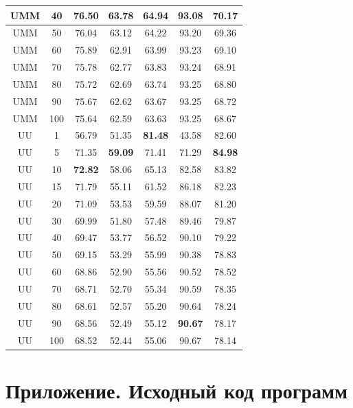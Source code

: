 \documentclass[oneside,final,12pt]{scrartcl}
\begin{document}
\begin{table}[p]
\begin{tabular}{|c|c|c|c|c|c|c|}
			\hline
			UMM & 40 & 76.50 & 63.78 & 64.94 & 93.08 & 70.17 \\
			\hline
			UMM & 50 & 76.04 & 63.12 & 64.22 & 93.20 & 69.36 \\
			\hline
			UMM & 60 & 75.89 & 62.91 & 63.99 & 93.23 & 69.10 \\
			\hline
			UMM & 70 & 75.78 & 62.77 & 63.83 & 93.24 & 68.91 \\
			\hline
			UMM & 80 & 75.72 & 62.69 & 63.74 & 93.25 & 68.80 \\
			\hline
			UMM & 90 & 75.67 & 62.62 & 63.67 & 93.25 & 68.72 \\
			\hline
			UMM & 100 & 75.64 & 62.59 & 63.63 & 93.25 & 68.67 \\
			\hline
			\hline
			\hline
			UU & 1 & 56.79 & 51.35 & \textbf{81.48} & 43.58 & 82.60 \\
			\hline
			UU & 5 & 71.35 & \textbf{59.09} & 71.41 & 71.29 & \textbf{84.98} \\
			\hline
			UU & 10 & \textbf{72.82} & 58.06 & 65.13 & 82.58 & 83.82 \\
			\hline
			UU & 15 & 71.79 & 55.11 & 61.52 & 86.18 & 82.23 \\
			\hline
			UU & 20 & 71.09 & 53.53 & 59.59 & 88.07 & 81.20  \\
			\hline
			UU & 30 & 69.99 & 51.80 & 57.48 & 89.46 & 79.87 \\
			\hline
			UU & 40 & 69.47 & 53.77 & 56.52 & 90.10 & 79.22 \\
			\hline
			UU & 50 & 69.15 & 53.29 & 55.99 & 90.38 & 78.83 \\
			\hline
			UU & 60 & 68.86 & 52.90 & 55.56 & 90.52 & 78.52 \\
			\hline
			UU & 70 & 68.71 & 52.70 & 55.34 & 90.59 & 78.35 \\
			\hline
			UU & 80 & 68.61 & 52.57 & 55.20 & 90.64 & 78.24 \\
			\hline
			UU & 90 & 68.56 & 52.49 & 55.12 & \textbf{90.67} & 78.17 \\
			\hline
			UU & 100 & 68.52 & 52.44 & 55.06 & 90.67 & 78.14 \\
			\hline
		\end{tabular}
	\end{table}


\newpage
\section*{Приложение. Исходный код программ}
\label{app:}
\end{document}
